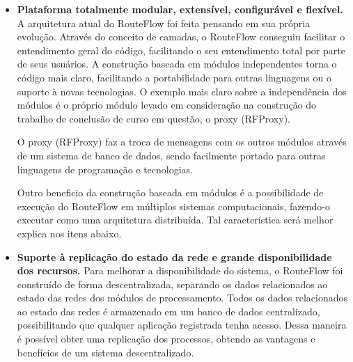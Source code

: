 \begin{itemize}
\item \textbf{Plataforma totalmente modular, extensível, 
configurável e flexível.} A arquitetura atual do RouteFlow 
foi feita pensando em sua própria evolução. Através do 
conceito de camadas, o RouteFlow conseguiu facilitar o entendimento
geral do código, facilitando o seu entendimento total por parte de 
seus usuários. A construção baseada em módulos independentes
torna o código mais claro, facilitando a portabilidade para outras 
linguagens ou o suporte à novas tecnologias. O exemplo mais 
claro sobre a independência dos módulos é o próprio módulo levado em consideração
na construção do trabalho de conclusão de curso em questão, o
proxy (RFProxy). 

O proxy (RFProxy) faz a troca de mensagens com os outros módulos 
através de um sistema de banco de dados, sendo facilmente
portado para outras linguagens de programação e tecnologias.

Outro beneficio da construção baseada em módulos é a possibilidade
de execução do RouteFlow em múltiplos sistemas computacionais, 
fazendo-o executar como uma arquitetura distribuída. Tal 
característica será melhor explica nos itens abaixo.
\item \textbf{Suporte à replicação do estado da rede e grande
disponibilidade dos recursos.} Para melhorar a disponibilidade
do sistema, o RouteFlow foi construído de forma descentralizada, 
separando os dados relacionados ao estado das redes dos módulos de processamento.
Todos os dados relacionados ao estado das redes é armazenado
em um banco de dados centralizado, possibilitando que qualquer aplicação 
registrada tenha acesso. Dessa maneira é possível obter uma 
replicação dos processos, obtendo as vantagens e benefícios
de um sistema descentralizado. 


\end{itemize}
